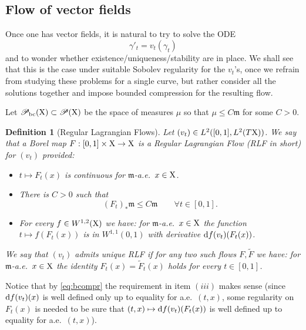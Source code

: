\documentclass[11pt]{article}
\numberwithin{equation}{section}
\newtheorem{definition}[theorem]{Definition}
\newcommand{\pr}{\mathscr P}
\newcommand{\X}{{\rm X}}
\newcommand{\mm}{{\mathfrak m}}
\renewcommand{\d}{{\rm d}}
\newcommand{\bc}{{\rm bc}}
\begin{document}
\subsection{Flow of vector fields}\label{se:flowrcd}
Once one has vector fields, it is natural to try to solve the ODE 
\begin{equation}
\label{eq:ODE}
\gamma'_t=v_t(\gamma_t)
\end{equation}
and to wonder whether existence/uniqueness/stability are in place. We shall see that this is the case under suitable Sobolev regularity for the $v_t$'s, once we refrain from studying these problems for a single curve, but rather consider all the solutions together and impose bounded compression for the resulting flow.

Let $\pr_\bc(\X)\subset \pr(\X)$ be the space of measures $\mu$ so that $\mu\leq C\mm$ for some $C>0$.
\begin{definition}[Regular Lagrangian Flows]
Let $(v_t)\in L^2([0,1],L^2(T\X))$. We say that a Borel map $F:[0,1]\times\X\to\X$ is a Regular Lagrangian Flow (RLF in short) for $(v_t)$ provided:
\begin{itemize}
\item[i)] $t\mapsto F_t(x)$ is continuous for $\mm$-a.e.\ $x\in\X$.
\item[ii)] There is $C>0$ such that
\begin{equation}
\label{eq:bcompr}
(F_t)_*\mm\leq C\mm\qquad\forall t\in[0,1].
\end{equation}
\item[iii)] For every $f\in W^{1,2}(\X)$ we have: for $\mm$-a.e.\ $x\in\X$ the function $t\mapsto f(F_t(x))$ is in $W^{1,1}(0,1)$ with derivative $\d f(v_t)(F_t(x))$.
\end{itemize}
We say that $(v_t)$ admits \emph{unique} RLF if for any two such flows $F,\tilde F$ we have: for  $\mm$-a.e.\ $x\in\X$ the identity  $F_t(x)=\tilde F_t(x)$ holds for every $t\in[0,1]$.
\end{definition}
Notice that by \eqref{eq:bcompr} the requirement in item $(iii)$ makes sense (since $\d f(v_t)(x)$ is well defined only up to equality for a.e.\ $(t,x)$, some regularity on $F_t(x)$ is needed to be sure that  $(t,x)\mapsto\d f(v_t)(F_t(x))$ is well defined up to equality  for a.e.\ $(t,x)$).  
\end{document}
